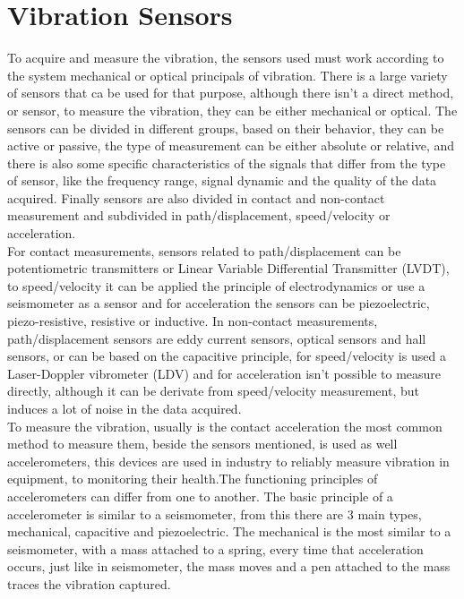 \section{Vibration Sensors}\label{sec:VibSens}
To acquire and measure the vibration, the sensors used must work according to the system mechanical or optical principals of vibration. There is a large variety of sensors that ca be used for that purpose, although there isn't a direct method, or sensor, to measure the vibration, they can be either mechanical or optical. The sensors can be divided in different groups, based on their behavior, they can be active or passive, the type of measurement can be either absolute or relative, and there is also some specific characteristics of the signals that differ from the type of sensor, like the frequency range, signal dynamic and the quality of the data acquired. Finally sensors are also divided in contact and non-contact measurement and subdivided in path/displacement, speed/velocity or acceleration.\\
For contact measurements, sensors related to path/displacement can be potentiometric transmitters or Linear Variable Differential Transmitter (LVDT), to speed/velocity it can be applied the principle of electrodynamics or use a seismometer as a sensor and for acceleration the sensors can be piezoelectric, piezo-resistive, resistive or inductive. In non-contact measurements, path/displacement sensors are eddy current sensors, optical sensors and hall sensors, or can be based on the capacitive principle, for speed/velocity is used a Laser-Doppler vibrometer (LDV) and for acceleration isn't possible to measure directly, although it can be derivate from speed/velocity measurement, but induces a lot of noise in the data acquired\cite{SensorsVibrationMeasurement}\cite{VibrationMeasurementVibration2019}.\\
To measure the vibration, usually is the contact acceleration the most common method to measure them, beside the sensors mentioned, is used as well accelerometers, this devices are used in industry to reliably measure vibration in equipment, to monitoring their health.The functioning  principles of accelerometers can differ from one to another. The basic principle of a accelerometer is similar to a seismometer, from this there are 3 main types, mechanical, capacitive and piezoelectric. The mechanical is the most similar to a seismometer, with a mass attached to a spring, every time that acceleration occurs, just like in seismometer, the mass moves and a pen attached to the mass traces the vibration captured.
